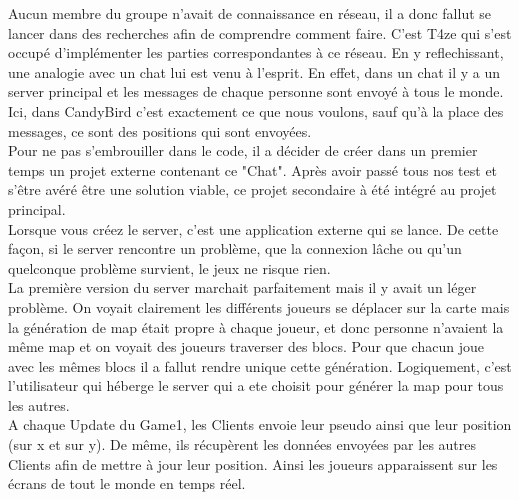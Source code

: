 \documentclass [11pt]{report}
\begin{document}
		Aucun membre du groupe n'avait de connaissance en réseau, il a donc fallut se lancer dans des recherches afin de comprendre comment faire. C'est T4ze qui s'est occupé d'implémenter les parties correspondantes à ce réseau. En y reflechissant, une analogie avec un chat lui est venu à l'esprit. En effet, dans un chat il y a un server principal et les messages de chaque personne sont envoyé à tous le monde. Ici, dans CandyBird c'est exactement ce que nous voulons, sauf qu'à la place des messages, ce sont des positions qui sont envoyées.\\
		
		Pour ne pas s'embrouiller dans le code, il a décider de créer dans un premier temps un projet externe contenant ce "Chat". Après avoir passé tous nos test et s'être avéré être une solution viable, ce projet secondaire à été intégré au projet principal.\\
		
		Lorsque vous créez le server, c'est une application externe qui se lance. De cette façon, si le server rencontre un problème, que la connexion lâche ou qu'un quelconque problème survient, le jeux ne risque rien. \\
				
		La première version du server marchait parfaitement mais il y avait un léger problème. On voyait clairement les différents joueurs se déplacer sur la carte mais la génération de map était propre à chaque joueur, et donc personne n'avaient la même map et on voyait des joueurs traverser des blocs. Pour que chacun joue avec les mêmes blocs il a fallut rendre unique cette génération. Logiquement, c'est l'utilisateur qui héberge le server qui a ete choisit pour générer la map pour tous les autres.\\
				
		A chaque Update du Game1, les Clients envoie leur pseudo ainsi que leur position (sur x et sur y). De même, ils récupèrent les données envoyées par les autres Clients afin de mettre à jour leur position. Ainsi les joueurs apparaissent sur les écrans de tout le monde en temps réel.
		
		
		
				
		
	
	
\end{document}
